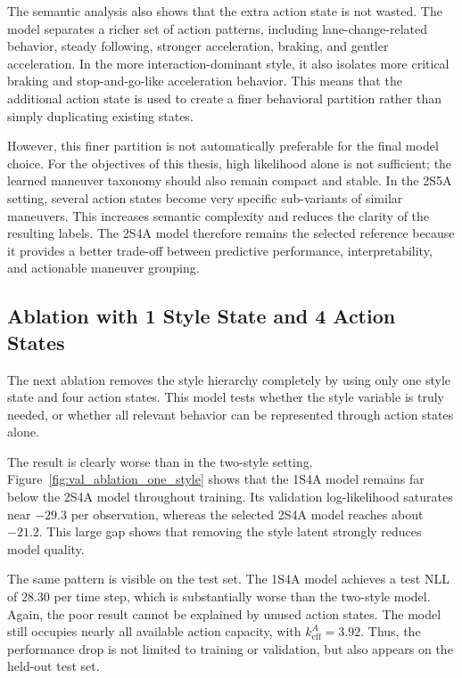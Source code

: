 \par The semantic analysis also shows that the extra action state is not wasted. 
The model separates a richer set of action patterns, including lane-change-related behavior, steady following, stronger acceleration, braking, and gentler acceleration. 
In the more interaction-dominant style, it also isolates more critical braking and stop-and-go-like acceleration behavior. 
This means that the additional action state is used to create a finer behavioral partition rather than simply duplicating existing states.

\par However, this finer partition is not automatically preferable for the final model choice. 
For the objectives of this thesis, high likelihood alone is not sufficient; the learned maneuver taxonomy should also remain compact and stable.
In the 2S5A setting, several action states become very specific sub-variants of similar maneuvers. 
This increases semantic complexity and reduces the clarity of the resulting labels. 
The 2S4A model therefore remains the selected reference because it provides a better trade-off between predictive performance, 
interpretability, and actionable maneuver grouping.


\subsection{Ablation with 1 Style State and 4 Action States}
The next ablation removes the style hierarchy completely by using only one style state and four action states. 
This model tests whether the style variable is truly needed, or whether all relevant behavior can be represented through action states alone. 

\par The result is clearly worse than in the two-style setting. 
Figure~\ref{fig:val_ablation_one_style} shows that the 1S4A model remains far below the 2S4A model throughout training. 
Its validation log-likelihood saturates near \(-29.3\) per observation, whereas the selected 2S4A model reaches about \(-21.2\). 
This large gap shows that removing the style latent strongly reduces model quality.   

\par The same pattern is visible on the test set. 
The 1S4A model achieves a test \ac{NLL} of \(28.30\) per time step, which is substantially worse than the two-style model. 
Again, the poor result cannot be 
explained by unused action states. 
The model still occupies nearly all available action capacity, with \(k_{\mathrm{eff}}^{A}=3.92\).
Thus, the performance drop is not limited to training or validation, but also appears on the held-out test set.

